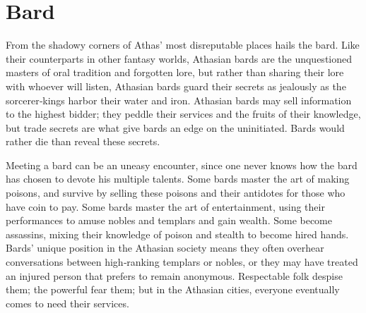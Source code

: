 \section{Bard}

From the shadowy corners of Athas' most disreputable places hails the bard. Like their counterparts in other fantasy worlds, Athasian bards are the unquestioned masters of oral tradition and forgotten lore, but rather than sharing their lore with whoever will listen, Athasian bards guard their secrets as jealously as the sorcerer‐kings harbor their water and iron. Athasian bards may sell information to the highest bidder; they peddle their services and the fruits of their knowledge, but trade secrets are what give bards an edge on the uninitiated. Bards would rather die than reveal these secrets.

Meeting a bard can be an uneasy encounter, since one never knows how the bard has chosen to devote his multiple talents. Some bards master the art of making poisons, and survive by selling these poisons and their antidotes for those who have coin to pay. Some bards master the art of entertainment, using their performances to amuse nobles and templars and gain wealth. Some become assassins, mixing their knowledge of poison and stealth to become hired hands. Bards' unique position in the Athasian society means they often overhear conversations between high‐ranking templars or nobles, or they may have treated an injured person that prefers to remain anonymous. Respectable folk despise them; the powerful fear them; but in the Athasian cities, everyone eventually comes to need their services.

